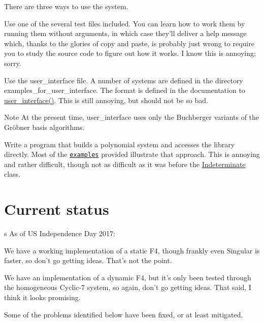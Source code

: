 There are three ways to use the system.
\begin{DoxyEnumerate}
\item Use one of the several {\ttfamily test} files included. You can learn how to work them by running them without arguments, in which case they'll deliver a help message which, thanks to the glories of copy and paste, is probably just wrong to require you to study the source code to figure out how it works. I know this is annoying; sorry.
\item Use the {\ttfamily user\+\_\+interface} file. A number of systems are defined in the directory {\ttfamily examples\+\_\+for\+\_\+user\+\_\+interface}. The format is defined in the documentation to {\ttfamily \hyperlink{group__utils_ga72d205e8226d578b892515edc527cc83}{user\+\_\+interface()}}. This is still annoying, but should not be so bad. \begin{DoxyNote}{Note}
At the present time, {\ttfamily user\+\_\+interface} uses only the Buchberger variants of the Gr\"{o}bner basis algorithms.
\end{DoxyNote}

\item Write a program that builds a polynomial system and accesses the library directly. Most of the \href{examples.html}{\tt examples} provided illustrate that approach. This is annoying and rather difficult, though not as difficult as it was before the {\ttfamily \hyperlink{group__polygroup_class_indeterminate}{Indeterminate}} class.
\end{DoxyEnumerate}\hypertarget{index_Status}{}\section{Current status}\label{index_Status}
s As of US Independence Day 2017\+: \begin{DoxyItemize}
\item We have a working implementation of a static F4, though frankly even Singular is faster, so don't go getting ideas. That's not the point. \item We have an implementation of a dynamic F4, but it's only been tested through the homogeneous Cyclic-\/7 system, so again, don't go getting ideas. That said, I think it looks promising. \item Some of the problems identified below have been fixed, or at least mitigated.\end{DoxyItemize}
